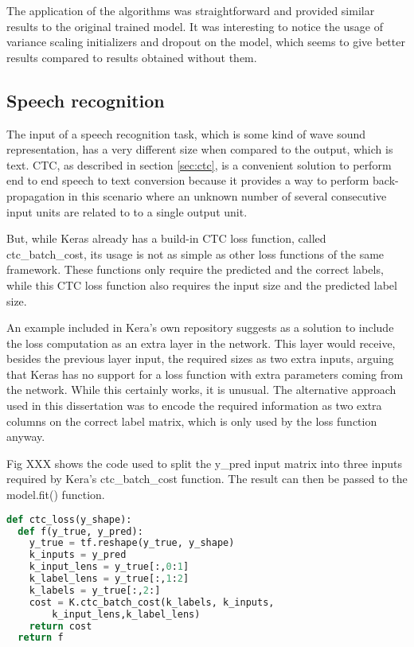 The application of the algorithms was straightforward and provided similar results to the original trained model. It was interesting to notice the usage of variance scaling initializers and dropout on the model, which seems to give better results compared to results obtained without them.


\subsection{Speech recognition}
The input of a speech recognition task, which is some kind of wave sound representation, has a very different size when compared to the output, which is text. CTC, as described in section \ref{sec:ctc}, is a convenient solution to perform end to end speech to text conversion because it provides a way to perform back-propagation in this scenario where an unknown number of several consecutive input units are related to to a single output unit.

But, while Keras already has a build-in CTC loss function, called ctc\_batch\_cost, its usage is not as simple as other loss functions of the same framework. These functions only require the predicted and the correct labels, while this CTC loss function also requires the input size and the predicted label size. 

 An example included in Kera's own repository  suggests as a solution to include the loss computation as an extra layer in the network. This layer would receive, besides the previous layer input, the required sizes as two extra inputs, arguing that Keras has no support for a loss function with extra parameters coming from the network. 
 While this certainly works, it is unusual. The alternative approach used in this dissertation was to encode the required information as two extra columns on the correct label matrix, which is only used by the loss function anyway.
 
 Fig XXX shows the code used to split the y\_pred input matrix into three inputs required by Kera's ctc\_batch\_cost function. The result can then be passed to the model.fit() function.

\noindent
\begin{minipage}{\linewidth}
\begin{lstlisting}[language=Python, frame=single, caption={ctc\_loss}]
def ctc_loss(y_shape):
  def f(y_true, y_pred):
    y_true = tf.reshape(y_true, y_shape)
    k_inputs = y_pred
    k_input_lens = y_true[:,0:1]
    k_label_lens = y_true[:,1:2]
    k_labels = y_true[:,2:]
    cost = K.ctc_batch_cost(k_labels, k_inputs,
        k_input_lens,k_label_lens)
    return cost
  return f
\end{lstlisting}
\end{minipage}

